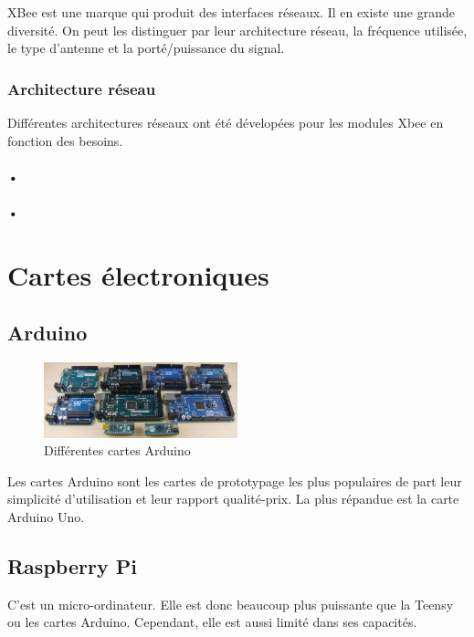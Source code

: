 \documentclass[a4paper, 11pt]{report}
\begin{document}
XBee est une marque qui produit des interfaces réseaux. Il en existe une grande diversité. On peut les distinguer par leur architecture réseau, la fréquence utilisée, le type d'antenne et la porté/puissance du signal.

\subsection{Architecture réseau}
Différentes architectures réseaux ont été dévelopées pour les modules Xbee en fonction des besoins.
\subsubsection{•}

\subsubsection{•}

\chapter{Cartes électroniques}

\section{Arduino}

\begin{figure}[h!]
\begin{centering}
\includegraphics[width=0.5\textwidth]{images/cartesArduino.jpg}
\caption{Différentes cartes Arduino}
\par\end{centering}
\end{figure}

Les cartes Arduino sont les cartes de prototypage les plus populaires de part leur simplicité d'utilisation et leur rapport qualité-prix. La plus répandue est la carte Arduino Uno.

\section{Raspberry Pi}
C'est un micro-ordinateur. Elle est donc beaucoup plus puissante que la Teensy ou les cartes Arduino. Cependant, elle est aussi limité dans ses capacités.
\end{document}
